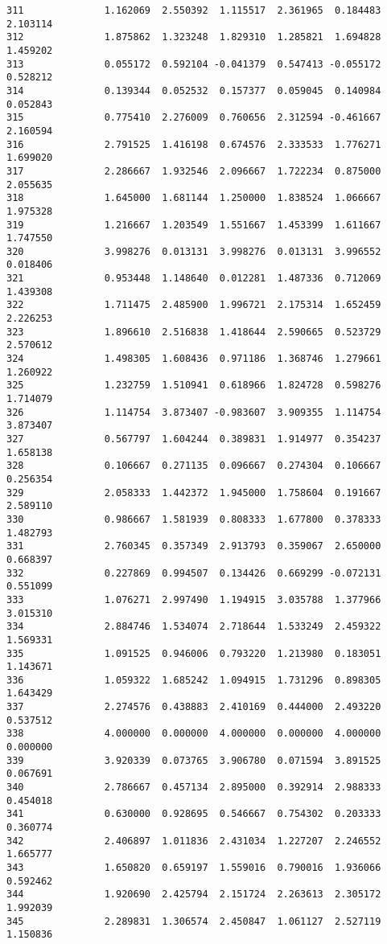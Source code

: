 \documentclass[11pt]{article}
\begin{document}
\begin{Verbatim}[commandchars=\\\{\}]
311              1.162069  2.550392  1.115517  2.361965  0.184483  2.103114
312              1.875862  1.323248  1.829310  1.285821  1.694828  1.459202
313              0.055172  0.592104 -0.041379  0.547413 -0.055172  0.528212
314              0.139344  0.052532  0.157377  0.059045  0.140984  0.052843
315              0.775410  2.276009  0.760656  2.312594 -0.461667  2.160594
316              2.791525  1.416198  0.674576  2.333533  1.776271  1.699020
317              2.286667  1.932546  2.096667  1.722234  0.875000  2.055635
318              1.645000  1.681144  1.250000  1.838524  1.066667  1.975328
319              1.216667  1.203549  1.551667  1.453399  1.611667  1.747550
320              3.998276  0.013131  3.998276  0.013131  3.996552  0.018406
321              0.953448  1.148640  0.012281  1.487336  0.712069  1.439308
322              1.711475  2.485900  1.996721  2.175314  1.652459  2.226253
323              1.896610  2.516838  1.418644  2.590665  0.523729  2.570612
324              1.498305  1.608436  0.971186  1.368746  1.279661  1.260922
325              1.232759  1.510941  0.618966  1.824728  0.598276  1.714079
326              1.114754  3.873407 -0.983607  3.909355  1.114754  3.873407
327              0.567797  1.604244  0.389831  1.914977  0.354237  1.658138
328              0.106667  0.271135  0.096667  0.274304  0.106667  0.256354
329              2.058333  1.442372  1.945000  1.758604  0.191667  2.589110
330              0.986667  1.581939  0.808333  1.677800  0.378333  1.482793
331              2.760345  0.357349  2.913793  0.359067  2.650000  0.668397
332              0.227869  0.994507  0.134426  0.669299 -0.072131  0.551099
333              1.076271  2.997490  1.194915  3.035788  1.377966  3.015310
334              2.884746  1.534074  2.718644  1.533249  2.459322  1.569331
335              1.091525  0.946006  0.793220  1.213980  0.183051  1.143671
336              1.059322  1.685242  1.094915  1.731296  0.898305  1.643429
337              2.274576  0.438883  2.410169  0.444000  2.493220  0.537512
338              4.000000  0.000000  4.000000  0.000000  4.000000  0.000000
339              3.920339  0.073765  3.906780  0.071594  3.891525  0.067691
340              2.786667  0.457134  2.895000  0.392914  2.988333  0.454018
341              0.630000  0.928695  0.546667  0.754302  0.203333  0.360774
342              2.406897  1.011836  2.431034  1.227207  2.246552  1.665777
343              1.650820  0.659197  1.559016  0.790016  1.936066  0.592462
344              1.920690  2.425794  2.151724  2.263613  2.305172  1.992039
345              2.289831  1.306574  2.450847  1.061127  2.527119  1.150836

\end{Verbatim}
\end{document}
